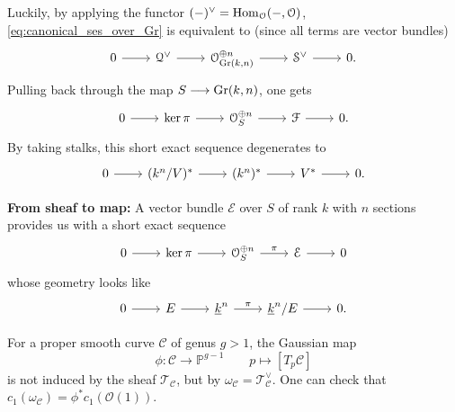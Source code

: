 \begin{remark}
Luckily, by applying the functor $(-)^{\vee}= \operatorname{\operatorname{Hom}}_{\mathcal{O}}(-,\mathcal{O})$, \eqref{eq:canonical_ses_over_Gr} is equivalent to (since all terms are vector bundles)
\begin{equation}\label{eq:canonical_ses_over_Gr_dual}
\begin{tikzcd}[column sep=2.25em]
	0 & {\mathcal{Q}^{\vee}} & {\mathcal{O}_{\Gr(k,n)}^{\oplus n}} & {\mathcal{S}^{\vee}} & 0.
	\arrow[from=1-1, to=1-2]
	\arrow[from=1-2, to=1-3]
	\arrow[from=1-3, to=1-4]
	\arrow[from=1-4, to=1-5]
\end{tikzcd}
\end{equation}
Pulling back through the map $S \longrightarrow \operatorname{Gr}(k,n)$, one gets
\[\begin{tikzcd}[column sep=2.25em]
	0 & {\ker \pi} & {\mathcal{O}_S^{\oplus n}} & {\mathcal{F}} & 0.
	\arrow[from=1-1, to=1-2]
	\arrow[from=1-2, to=1-3]
	\arrow[from=1-3, to=1-4]
	\arrow[from=1-4, to=1-5]
\end{tikzcd}\]
By taking stalks, this short exact sequence degenerates to
\[\begin{tikzcd}[column sep=2.25em]
	0 & {(k^n/V)^*} & {(k^n)^*} & V^* & 0. 
	\arrow[from=1-1, to=1-2]
	\arrow[from=1-2, to=1-3]
	\arrow[from=1-3, to=1-4]
	\arrow[from=1-4, to=1-5]
\end{tikzcd}\]

\textbf{From sheaf to map:} A vector bundle $\mathcal{E}$ over $S$ of rank $k$ with $n$ sections provides us with a short exact sequence 
\[\begin{tikzcd}[column sep=2.25em]
	0 & {\ker \pi} & {\mathcal{O}_S^{\oplus n}} & {\mathcal{E}} & 0
	\arrow[from=1-1, to=1-2]
	\arrow[from=1-2, to=1-3]
	\arrow["\pi", from=1-3, to=1-4]
	\arrow[from=1-4, to=1-5]
\end{tikzcd}\]
whose geometry looks like
\[\begin{tikzcd}[column sep=2.25em]
	0 & {E} & {\underline{k}^n} & {\underline{k}^n/E} & 0.
	\arrow[from=1-1, to=1-2]
	\arrow[from=1-2, to=1-3]
	\arrow["\pi", from=1-3, to=1-4]
	\arrow[from=1-4, to=1-5]
\end{tikzcd}\]
\end{remark}
\begin{eg}
For a proper smooth curve $\mathcal{C}$ of genus $g>1$, the Gaussian map
$$\phi: \mathcal{C} \longrightarrow \mathbb{P}^{g-1} \qquad p \longmapsto [T_p\mathcal{C}]$$
is not induced by the sheaf $\mathcal{T}_{\mathcal{C}}$, but by $\omega_{\mathcal{C}}=\mathcal{T}_{\mathcal{C}}^{\vee}$. One can check that $c_1(\omega_{\mathcal{C}})=\phi^* c_1(\mathcal{O}(1))$.
\end{eg}
